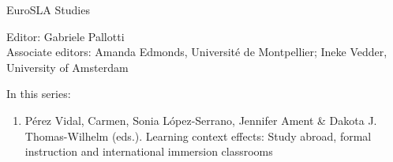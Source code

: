 {\large  EuroSLA Studies}

\bigskip

Editor: Gabriele Pallotti\\
Associate editors: 
  Amanda Edmonds, Université de Montpellier; 
  Ineke Vedder, University of Amsterdam


\bigskip

In this series:

\begin{enumerate}
\item Pérez Vidal, Carmen, Sonia López-Serrano, Jennifer Ament \& Dakota J. Thomas-Wilhelm (eds.).  Learning context effects: Study abroad, formal instruction and international immersion classrooms
\end{enumerate}



